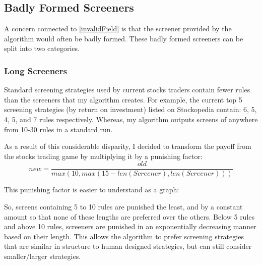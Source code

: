 \subsection{Badly Formed Screeners}
A concern connected to \ref{invalidField} is that the screener provided by the algorithm would often be badly formed. These badly formed screeners can be split into two categories.

\subsubsection{Long Screeners}
Standard screening strategies used by current stocks traders contain fewer rules than the screeners that my algorithm creates. For example, the current top 5 screening strategies (by return on investment) listed on Stockopedia contain: 6, 5, 4, 5, and 7 rules respectively. \cite{stockopediaScreens} Whereas, my algorithm outputs screens of anywhere from 10-30 rules in a standard run. \newline

As a result of this considerable disparity, I decided to transform the payoff from the stocks trading game by multiplying it by a punishing factor:
\begin{equation}
    new = \frac{old}{max(10, max(15 - len(Screener), len(Screener)))}
\end{equation}

This punishing factor is easier to understand as a graph: \newline
\begin{center}
\end{center}

So, screens containing 5 to 10 rules are punished the least, and by a constant amount so that none of these lengths are preferred over the others. Below 5 rules and above 10 rules, screeners are punished in an exponentially decreasing manner based on their length. This allows the algorithm to prefer screening strategies that are similar in structure to human designed strategies, but can still consider smaller/larger strategies.

